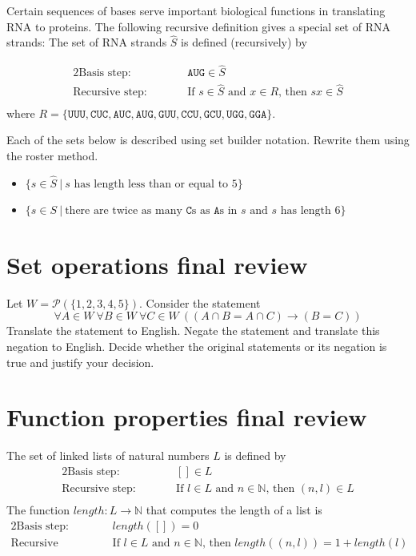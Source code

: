 \documentclass[12pt, oneside]{article}
\newcommand{\A}[0]{\texttt{A}}
\newcommand{\C}[0]{\texttt{C}}
\newcommand{\G}[0]{\texttt{G}}
\newcommand{\U}[0]{\texttt{U}}
\begin{document}
Certain 
 sequences of bases serve important biological functions in translating RNA to proteins. The following
 recursive definition gives a special set of RNA strands: The set of RNA strands $\hat{S}$ is defined (recursively)
 by 
 
 \begin{alignat*}{2}
\text{Basis step:} & & \A\U\G \in \hat{S}\\
\text{Recursive step:} & \qquad& \text{If } s \in \hat{S} \text{ and } x \in R \text{, then } sx\in \hat{S}\\
 \end{alignat*}
 where $R = \{ \U\U\U, \C\U\C, \A\U\C, \A\U\G, \G\U\U, \C\C\U, \G\C\U, \U\G\G, \G\G\A \}$.

Each of the sets below is described using set builder notation. Rewrite them using the roster method. 
\begin{itemize}
\item $\{s \in \hat{S} ~|~ s \text{ has length less than or equal to $5$} \}$ 

\vspace{50pt}


\item $\{s \in S ~|~ \text{there are twice as many $\C$s as $\A$s in $s$ and $s$ has length $6$} \}$ 

\vspace{50pt}

\end{itemize} \vfill
\section*{Set operations final review}


Let $W = \mathcal{P}( \{ 1,2,3,4,5\})$. Consider the statement 
\[
\forall A \in W~ \forall B \in W ~ \forall C \in W~ ((A \cap B = A \cap C) \to (B=C) )
\]
Translate the statement to English.
Negate the statement 
and translate this negation to English.
Decide whether the original statements or its negation is true
and justify your decision.
 \vfill
\section*{Function properties final review}


The set of linked lists of natural numbers $L$ is defined by 
 \begin{alignat*}{2}
\text{Basis step:} & &[] \in L \\
\text{Recursive step:} & \qquad& \text{If } l \in L \text{ and } n \in \mathbb{N} \text{, then } (n,l) \in L\\
 \end{alignat*}
 The function $length: L \to \mathbb{N}$ that computes the length of a list is
  \begin{alignat*}{2}
\text{Basis step:} & &length([]) = 0\\
\text{Recursive step:} & \qquad& \text{If $l \in L$ and $n \in \mathbb{N}$, then } length( ( n,l) ) = 1 + length(l)\\
 \end{alignat*}
\end{document}
